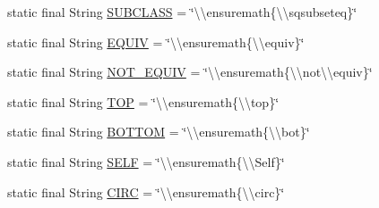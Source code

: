 \begin{DoxyCompactItemize}
\item 
static final String \hyperlink{classorg_1_1coode_1_1owlapi_1_1latex_1_1_latex_object_visitor_a157ebb8706ee279e1ba38d5f440054cd}{S\-U\-B\-C\-L\-A\-S\-S} = \char`\"{}\textbackslash{}\textbackslash{}ensuremath\{\textbackslash{}\textbackslash{}sqsubseteq\}\char`\"{}
\item 
static final String \hyperlink{classorg_1_1coode_1_1owlapi_1_1latex_1_1_latex_object_visitor_a5bbf2d3690be56e31608159c9ca2716e}{E\-Q\-U\-I\-V} = \char`\"{}\textbackslash{}\textbackslash{}ensuremath\{\textbackslash{}\textbackslash{}equiv\}\char`\"{}
\item 
static final String \hyperlink{classorg_1_1coode_1_1owlapi_1_1latex_1_1_latex_object_visitor_a00e3b06ae0e31a5fe5cf58609ce27d83}{N\-O\-T\-\_\-\-E\-Q\-U\-I\-V} = \char`\"{}\textbackslash{}\textbackslash{}ensuremath\{\textbackslash{}\textbackslash{}not\textbackslash{}\textbackslash{}equiv\}\char`\"{}
\item 
static final String \hyperlink{classorg_1_1coode_1_1owlapi_1_1latex_1_1_latex_object_visitor_a33bcc6b15ef1d06e466614bd6241b892}{T\-O\-P} = \char`\"{}\textbackslash{}\textbackslash{}ensuremath\{\textbackslash{}\textbackslash{}top\}\char`\"{}
\item 
static final String \hyperlink{classorg_1_1coode_1_1owlapi_1_1latex_1_1_latex_object_visitor_a719627cd027c5ce68196809671d754b8}{B\-O\-T\-T\-O\-M} = \char`\"{}\textbackslash{}\textbackslash{}ensuremath\{\textbackslash{}\textbackslash{}bot\}\char`\"{}
\item 
static final String \hyperlink{classorg_1_1coode_1_1owlapi_1_1latex_1_1_latex_object_visitor_ac6a66bd17e8283b5ba409fef83db4ae6}{S\-E\-L\-F} = \char`\"{}\textbackslash{}\textbackslash{}ensuremath\{\textbackslash{}\textbackslash{}Self\}\char`\"{}
\item 
static final String \hyperlink{classorg_1_1coode_1_1owlapi_1_1latex_1_1_latex_object_visitor_a87aa255583d837e88940e6a0eb3cdc12}{C\-I\-R\-C} = \char`\"{}\textbackslash{}\textbackslash{}ensuremath\{\textbackslash{}\textbackslash{}circ\}\char`\"{}
\end{DoxyCompactItemize}

